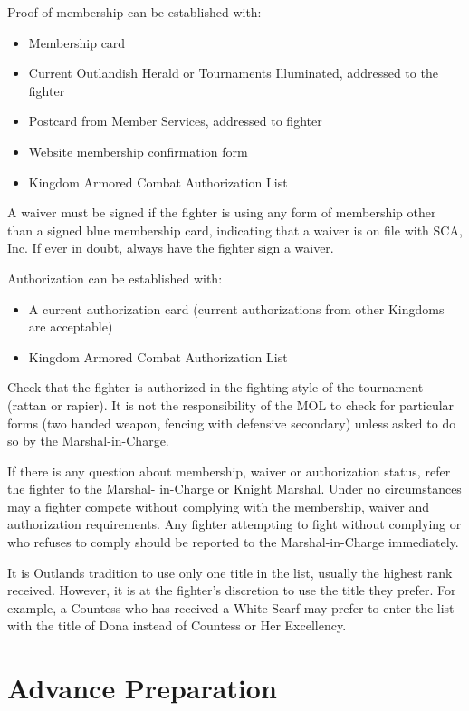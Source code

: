 \documentclass{article}
\begin{document}
Proof of membership can be established with:
\begin{itemize}
\item Membership card
\item Current Outlandish Herald or Tournaments Illuminated, addressed to the fighter
\item Postcard from Member Services, addressed to fighter
\item Website membership confirmation form
\item Kingdom Armored Combat Authorization List
\end{itemize}

A waiver must be signed if the fighter is using any form of membership other than a
signed blue membership card, indicating that a waiver is on file with SCA, Inc. If ever in doubt, always have the
fighter sign a waiver.

Authorization can be established with:

\begin{itemize}
\item A current authorization card (current authorizations from other Kingdoms are acceptable)
\item Kingdom Armored Combat Authorization List
\end{itemize}

Check that the fighter is authorized in the fighting style of the tournament (rattan or rapier). It is not the
responsibility of the MOL to check for particular forms (two handed weapon, fencing with defensive
secondary) unless asked to do so by the Marshal-in-Charge.

If there is any question about membership, waiver or authorization status, refer the fighter to the Marshal-
in-Charge or Knight Marshal. Under no circumstances may a fighter compete without complying with the
membership, waiver and authorization requirements. Any fighter attempting to fight without complying
or who refuses to comply should be reported to the Marshal-in-Charge immediately.

It is Outlands tradition to use only one title in the list, usually the highest rank received. However, it is at
the fighter’s discretion to use the title they prefer. For example, a Countess who has received a White
Scarf may prefer to enter the list with the title of Dona instead of Countess or Her Excellency.

\section{Advance Preparation}
\end{document}
